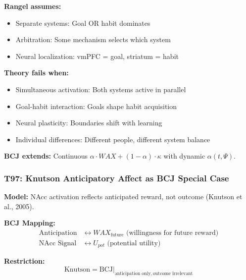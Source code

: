 \begin{tcolorbox}[colback=red!5!white, colframe=red!75!black,
    title=Boundary Condition: Where Rangel Fails]
\textbf{Rangel assumes:}
\begin{itemize}[nosep]
\item Separate systems: Goal OR habit dominates
\item Arbitration: Some mechanism selects which system
\item Neural localization: vmPFC = goal, striatum = habit
\end{itemize}

\textbf{Theory fails when:}
\begin{itemize}[nosep]
\item Simultaneous activation: Both systems active in parallel
\item Goal-habit interaction: Goals shape habit acquisition
\item Neural plasticity: Boundaries shift with learning
\item Individual differences: Different people, different system balance
\end{itemize}

\textbf{BCJ extends:} Continuous $\alpha \cdot WAX + (1-\alpha) \cdot \kappa$ with dynamic $\alpha(t, \Psi)$.
\end{tcolorbox}

\subsubsection*{T97: Knutson Anticipatory Affect as BCJ Special Case}

\textbf{Model:} NAcc activation reflects anticipated reward, not outcome (Knutson et al., 2005).

\textbf{BCJ Mapping:}
\begin{align}
\text{Anticipation} &\leftrightarrow WAX_{\text{future}} \text{ (willingness for future reward)} \\
\text{NAcc Signal} &\leftrightarrow U_{pot} \text{ (potential utility)}
\end{align}

\textbf{Restriction:}
\begin{equation}
\text{Knutson} = \text{BCJ} \big|_{\text{anticipation only}, \, \text{outcome irrelevant}}
\end{equation}

